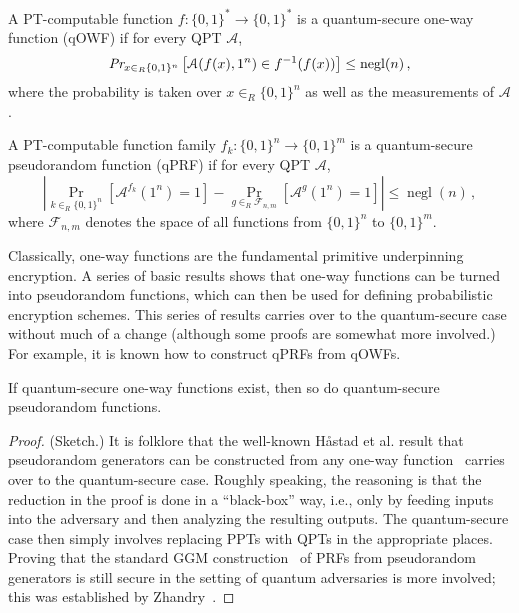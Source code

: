 \documentclass[envcountsame]{llncs}
\numberwithin{equation}{section}
\newcommand{\opn}{\operatorname}
\newcommand{\algo}{\mathcal}
\newcommand{\negl}{\opn{negl}}
\newcommand{\inrand}{\in_R}
\newcommand{\prob}{\opn{Pr}}
\begin{document}
\begin{definition}\label{def:quantum-secure-owf}
A PT-computable function $f:\{0,1\}^* \rightarrow \{0, 1\}^*$ is a quantum-secure one-way function (qOWF) if for every QPT $\algo A$, 
$$
\emph{Pr}_{x \inrand \{0, 1\}^n} \left[\algo A (f(x), 1^n) \in f^{-1}(f(x)) \right] \leq \negl(n)\,,
$$
where the probability is taken over $x \inrand \{0, 1\}^n$ as well as the measurements of $\algo A$.
\end{definition}

\begin{definition}\label{def:quantum-secure-prf}
A PT-computable function family $f_k : \{0,1\}^n \rightarrow \{0, 1\}^m$ is a quantum-secure pseudorandom function (qPRF) if for every QPT $\algo A$, 
$$
\left|\prob_{k \inrand \{0, 1\}^n} [\algo A^{f_k}(1^n) = 1] - \prob_{g \inrand \mathcal F_{n, m}}[ \algo A^g(1^n) = 1]\right|
\leq \negl(n)\,,
$$
where $\mathcal F_{n, m}$ denotes the space of all functions from $\{0,1\}^n$ to $\{0,1\}^m$.
\end{definition}

Classically, one-way functions are the fundamental primitive underpinning encryption. A series of basic results shows that one-way functions can be turned into pseudorandom functions, which can then be used for defining probabilistic encryption schemes. This series of results carries over to the quantum-secure case without much of a change (although some proofs are somewhat more involved.) For example, it is known how to construct qPRFs from qOWFs.

\begin{theorem}\label{thm:qOWF-implies-qPRF}
If quantum-secure one-way functions exist, then so do quantum-secure pseudorandom functions.
\end{theorem}
\begin{proof} (Sketch.) It is folklore that the well-known H{\aa}stad et al. result that pseudorandom generators can be constructed from any one-way function~\cite{HILL99} carries over to the quantum-secure case. Roughly speaking, the reasoning is that the reduction in the proof is done in a ``black-box'' way, i.e., only by feeding inputs into the adversary and then analyzing the resulting outputs. The quantum-secure case then simply involves replacing PPTs with QPTs in the appropriate places. Proving that the standard GGM construction~\cite{GGM86} of PRFs from pseudorandom generators is still secure in the setting of quantum adversaries is more involved; this was established by Zhandry~\cite{Zhandry2012}.
\end{proof}
\end{document}
